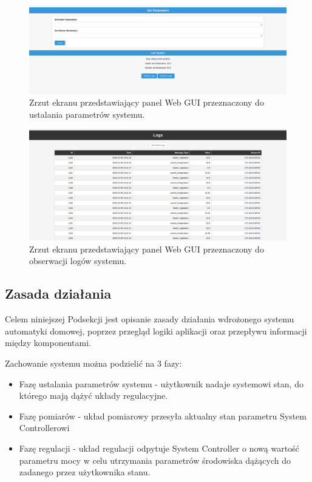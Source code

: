             \begin{figure}[H]
                \centering
                \includegraphics[width=0.8\linewidth]{graphics/screenshots/web-gui-set-parameters.png}
                \caption{Zrzut ekranu przedstawiający panel Web GUI przeznaczony do ustalania parametrów systemu.}
                \label{fig:web-gui-set-parameters}
            \end{figure}

            \begin{figure}[H]
                \centering
                \includegraphics[width=0.8\linewidth]{graphics/screenshots/web-gui-logs.png}
                \caption{Zrzut ekranu przedstawiający panel Web GUI przeznaczony do obserwacji logów systemu.}
                \label{fig:web-gui-logs}
            \end{figure}

    \subsection{Zasada działania}

    Celem niniejszej Podsekcji jest opisanie zasady działania wdrożonego systemu automatyki domowej, poprzez przegląd logiki aplikacji oraz przepływu informacji między komponentami.
    
    Zachowanie systemu można podzielić na 3 fazy:
    \begin{itemize}
        \item Fazę ustalania parametrów systemu - użytkownik nadaje systemowi stan, do którego mają dążyć układy regulacyjne.
        \item Fazę pomiarów - układ pomiarowy przesyła aktualny stan parametru System Controllerowi
        \item Fazę regulacji - układ regulacji odpytuje System Controller o nową wartość parametru mocy w celu utrzymania parametrów środowiska dążących do zadanego przez użytkownika stanu.
    \end{itemize}

